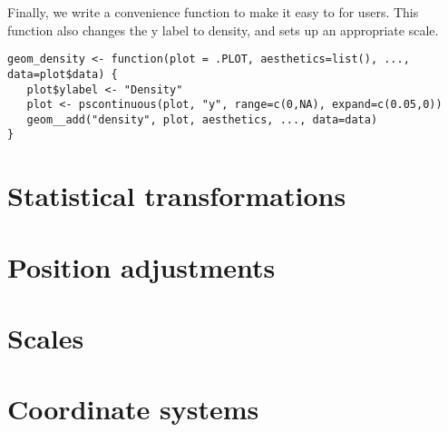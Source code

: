 Finally, we write a convenience function to make it easy to for users.  This function also changes the y label to density, and sets up an appropriate scale.

\begin{verbatim}
geom_density <- function(plot = .PLOT, aesthetics=list(), ..., data=plot$data) {
   plot$ylabel <- "Density"
   plot <- pscontinuous(plot, "y", range=c(0,NA), expand=c(0.05,0))
   geom__add("density", plot, aesthetics, ..., data=data)
}  
\end{verbatim}

\section{Statistical transformations}
\label{sec:statistical_transformations}

\section{Position adjustments}
\label{sec:position_adjustments}

\section{Scales}
\label{sec:scales}

\section{Coordinate systems}
\label{sec:coordinate_systems}




